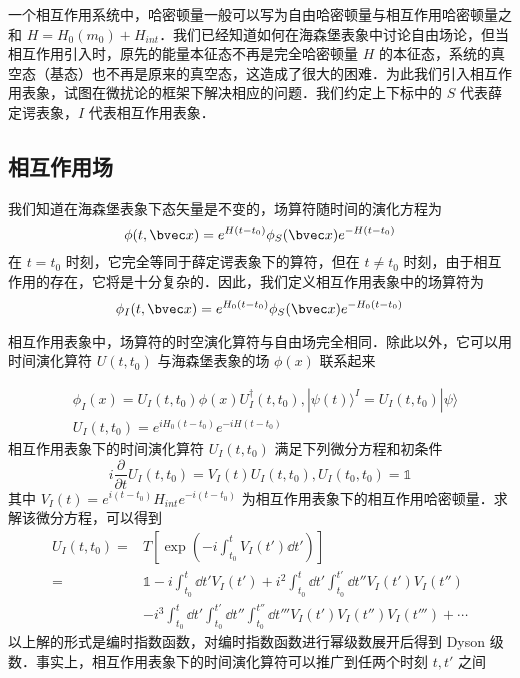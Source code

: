 
一个相互作用系统中，哈密顿量一般可以写为自由哈密顿量与相互作用哈密顿量之和 $H=H_0(m_0)+H_{int}$．我们已经知道如何在海森堡表象中讨论自由场论，但当相互作用引入时，原先的能量本征态不再是完全哈密顿量 $H$ 的本征态，系统的真空态（基态）也不再是原来的真空态，这造成了很大的困难．为此我们引入相互作用表象，试图在微扰论的框架下解决相应的问题．我们约定上下标中的 $S$ 代表薛定谔表象，$I$ 代表相互作用表象．
\subsection{相互作用场}
我们知道在海森堡表象下态矢量是不变的，场算符随时间的演化方程为
\begin{equation}
\phi(t,\bvec x)=e^{H(t-t_0)}\phi_S(\bvec x)e^{-H(t-t_0)}
\end{equation}
在 $t=t_0$ 时刻，它完全等同于薛定谔表象下的算符，但在 $t\neq t_0$ 时刻，由于相互作用的存在，它将是十分复杂的．因此，我们定义相互作用表象中的场算符为
\begin{equation}
\phi_I(t,\bvec x)=e^{H_0(t-t_0)}\phi_S(\bvec x)e^{-H_0(t-t_0)}
\end{equation}

相互作用表象中，场算符的时空演化算符与自由场完全相同．除此以外，它可以用时间演化算符 $U(t,t_0)$ 与海森堡表象的场 $\phi(x)$ 联系起来

\begin{equation}
\begin{aligned}
&\phi_I(x)=U_I(t,t_0)\phi(x)U_I^\dagger(t,t_0),|\psi(t)\rangle^I=U_I(t,t_0)|\psi\rangle\\ 
&U_I(t,t_0)=e^{iH_0(t-t_0)}e^{-iH(t-t_0)}
\end{aligned}
\end{equation}
相互作用表象下的时间演化算符 $U_I(t,t_0)$ 满足下列微分方程和初条件
\begin{equation}
i\frac{\partial}{\partial t}U_I(t,t_0)=V_I(t)U_I(t,t_0), U_I(t_0,t_0)=\mathbb{1}
\end{equation}
其中 $V_I(t)=e^{i(t-t_0)}H_{int} e^{-i(t-t_0)}$ 为相互作用表象下的相互作用哈密顿量．求解该微分方程，可以得到
\begin{equation}
\begin{aligned}
U_I(t,t_0)=&T\left[\exp\left(-i\int_{t_0}^{t}V_I(t')\dd t'\right)\right]\\
=&\mathbb{1}-i\int_{t_0}^t \dd t' V_I(t')+i^2\int_{t_0}^t \dd t'  \int_{t_0}^{t'} \dd t'' V_I(t')V_I(t'') \\
 &-i^3\int_{t_0}^t \dd t'  \int_{t_0}^{t'} \dd t'' \int_{t_0}^{t''}\dd t''' V_I(t')V_I(t'')V_I(t''')+\cdots
\end{aligned}
\end{equation}
以上解的形式是编时指数函数，对编时指数函数进行幂级数展开后得到 Dyson 级数．事实上，相互作用表象下的时间演化算符可以推广到任两个时刻 $t,t'$ 之间
